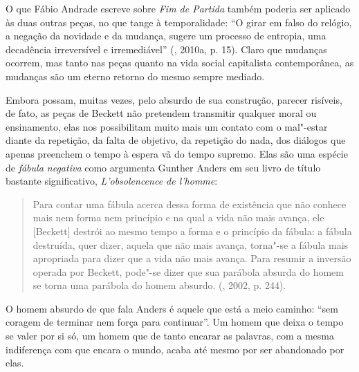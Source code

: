 O que Fábio Andrade escreve sobre \emph{Fim de Partida} também poderia
ser aplicado às duas outras peças, no que tange à temporalidade: ``O
girar em falso do relógio, a negação da novidade e da mudança, sugere um
processo de entropia, uma decadência irreversível e irremediável''
(, 2010a, p. 15). Claro que mudanças ocorrem, mas tanto nas peças
quanto na vida social capitalista contemporânea, as mudanças são um
eterno retorno do mesmo sempre mediado.

Embora possam, muitas vezes, pelo absurdo de sua construção, parecer
risíveis, de fato, as peças de Beckett não pretendem transmitir qualquer
moral ou ensinamento, elas nos possibilitam muito mais um contato com o
mal"-estar diante da repetição, da falta de objetivo, da repetição do
nada, dos diálogos que apenas preenchem o tempo à espera vã do tempo
supremo. Elas são uma espécie de \emph{fábula negativa} como argumenta
Gunther Anders em seu livro de título bastante significativo,
\emph{L'obsolencence de l'homme}:

\begin{quote}
Para contar uma fábula acerca dessa forma de existência que não conhece
mais nem forma nem princípio e na qual a vida não mais avança, ele
[Beckett] destrói ao mesmo tempo a forma e o princípio da fábula: a
fábula destruída, quer dizer, aquela que não mais avança, torna"-se a
fábula mais apropriada para dizer que a vida não mais avança. Para
resumir a inversão operada por Beckett, pode"-se dizer que sua parábola
absurda do homem se torna uma parábola do homem absurdo. (, 2002,
p. 244).
\end{quote}

O homem absurdo de que fala Anders é aquele que está a meio caminho:
``sem coragem de terminar nem força para continuar''. Um homem que deixa
o tempo se valer por si só, um homem que de tanto encarar as palavras, com a mesma
indiferença com que encara o mundo, acaba até mesmo por ser abandonado por elas.

